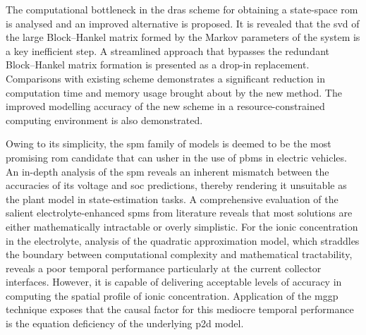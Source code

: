 The computational bottleneck in the \glspl{dra} scheme for obtaining a
state-space \gls{rom} is analysed and an improved alternative is proposed. It is
revealed that the \gls{svd} of the large Block–Hankel matrix formed by the
Markov parameters of the system is a key inefficient step. A streamlined
approach that bypasses the redundant Block–Hankel matrix formation is presented
as a drop-in replacement. Comparisons with existing  scheme demonstrates a
significant reduction in computation time and memory usage brought about by the
new method. The improved modelling accuracy of the new scheme in a
resource-constrained computing environment is also demonstrated.


Owing to its simplicity, the \gls{spm} family of models is deemed to be the most
promising  \gls{rom} candidate  that  can usher  in the  use  of \glspl{pbm}  in
electric vehicles.  An in-depth  analysis of the  \gls{spm} reveals  an inherent
mismatch  between  the accuracies  of  its  voltage and  \gls{soc}  predictions,
thereby rendering it unsuitable as the  plant model in state-estimation tasks. A
comprehensive evaluation  of the  salient electrolyte-enhanced  \glspl{spm} from
literature reveals that most solutions  are either mathematically intractable or
overly  simplistic. For  the ionic  concentration in  the electrolyte,  analysis
of  the quadratic  approximation  model, which  straddles  the boundary  between
computational complexity and mathematical  tractability, reveals a poor temporal
performance particularly  at the  current collector  interfaces. However,  it is
capable of  delivering acceptable  levels of accuracy  in computing  the spatial
profile of ionic concentration. Application  of the \gls{mggp} technique exposes
that the  causal factor for this  mediocre temporal performance is  the equation
deficiency of the underlying \gls{p2d} model.

\addlines[1.5]

